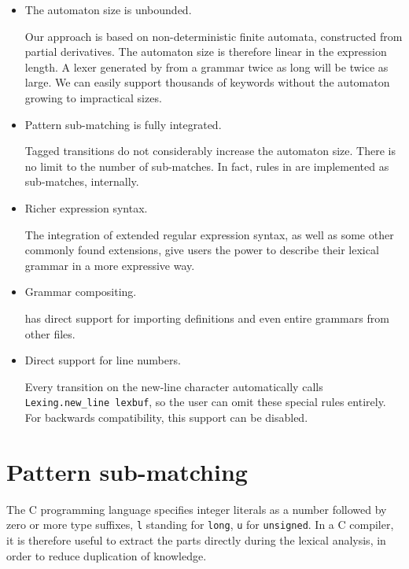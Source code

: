 \begin{itemize}

   \item The automaton size is unbounded.

      Our approach is based on non-deterministic finite automata, constructed
      from partial derivatives. The automaton size is therefore linear in the
      expression length. A lexer generated by \reml{} from a grammar twice as
      long will be twice as large. We can easily support thousands of keywords
      without the automaton growing to impractical sizes.

   \item Pattern sub-matching is fully integrated.

      Tagged transitions do not considerably increase the automaton size. There
      is no limit to the number of sub-matches. In fact, rules in \reml{} are
      implemented as sub-matches, internally.

   \item Richer expression syntax.

      The integration of extended regular expression syntax, as well as some
      other commonly found extensions, give \reml{} users the power to describe
      their lexical grammar in a more expressive way.

   \item Grammar compositing.

      \reml{} has direct support for importing definitions and even entire
      grammars from other files.

   \item Direct support for line numbers.

      Every transition on the new-line character automatically calls
      \texttt{Lexing.new\_line lexbuf}, so the user can omit these special rules
      entirely. For backwards compatibility, this support can be disabled.

\end{itemize}


\section{Pattern sub-matching}

The C programming language specifies integer literals as a number followed by
zero or more type suffixes, \texttt{l} standing for \texttt{long}, \texttt{u}
for \texttt{unsigned}. In a C compiler, it is therefore useful to extract the
parts directly during the lexical analysis, in order to reduce duplication of
knowledge.

